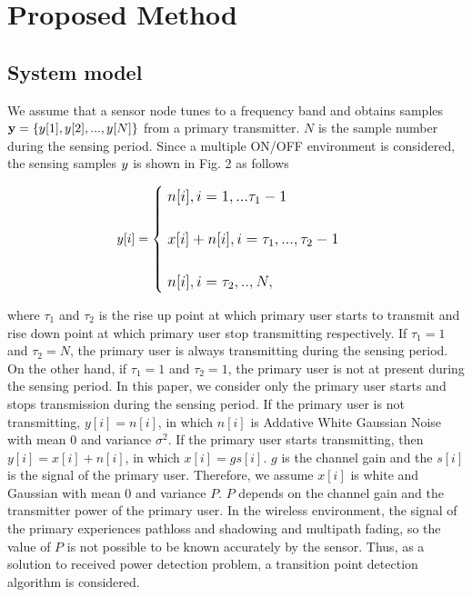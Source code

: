 \chapter[Active Period Detection Method of Primary Signal for Spectrum Database]{Proposed Method}
\label{chapter:Propose}
\section{System model}
\label{system}

We assume that a sensor node tunes to a frequency band and obtains samples ${\bf y}=\left\{y[1],y[2],...,y[N]\right\}$ from a primary transmitter. $N$ is the sample number during the sensing period. Since a multiple ON/OFF environment is considered, the sensing samples ${\boldmath y}$ is shown in Fig. 2 as follows

\begin{eqnarray}
{\large
y[i] = 
\begin{cases}
\;n[i],    i=1,...\tau_1-1 \\ \nonumber
\; \\ \nonumber
\;x[i]+n[i], i=\tau_1,...,\tau_2-1 \\
\; \\ \nonumber
\;n[i],    i=\tau_2,..,N,
\end{cases}
}
\end{eqnarray}

where $\tau_1$ and $\tau_2$ is the rise up point at which primary user starts to transmit and rise down point at which primary user stop transmitting respectively. If $\tau_1=1$ and $\tau_2=N$, the primary user is always transmitting during the sensing period. On the other hand, if $\tau_1=1$ and $\tau_2=1$, the primary user is not at present during the sensing period. In this paper, we consider only the primary user starts and stops transmission during the sensing period.
If the primary user is not transmitting, $y[i] = n[i]$, in which $n[i]$ is Addative White Gaussian Noise with mean 0 and variance $\sigma^2$. If the primary user starts transmitting, then $y[i] = x[i] + n[i]$, in which $x[i] = gs[i]$. $g$ is the channel gain and the $s[i]$ is the signal of the primary user. Therefore, we assume $x[i]$ is white and Gaussian with mean 0 and variance $P$. $P$ depends on the channel gain and the transmitter power of the primary user. In the wireless environment, the signal of the primary experiences pathloss and shadowing and  multipath fading, so the value of $P$ is not possible to be known accurately by the sensor. Thus, as a solution to received power detection problem, a transition point detection algorithm is considered. 

